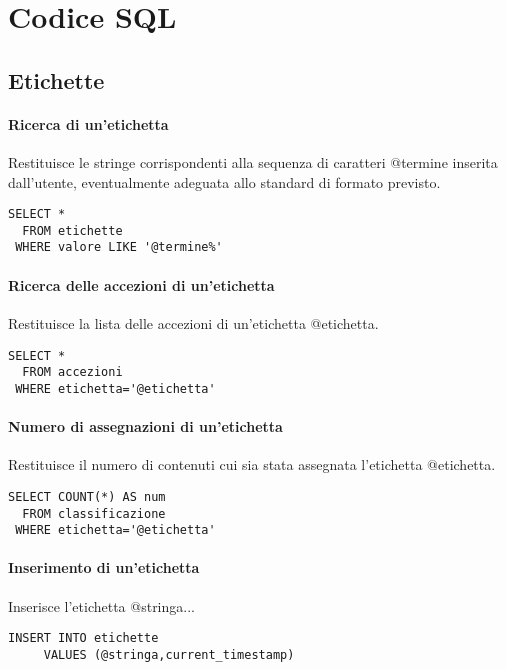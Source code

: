 \section*{Codice SQL}

\subsection*{Etichette}

\paragraph{Ricerca di un'etichetta}
Restituisce le stringe corrispondenti alla sequenza di caratteri \textsf{@termine} inserita dall'utente, eventualmente adeguata allo standard di formato previsto.

\begin{verbatim}
SELECT *
  FROM etichette	
 WHERE valore LIKE '@termine%'
\end{verbatim}
	
\paragraph{Ricerca delle accezioni di un'etichetta}
Restituisce la lista delle accezioni di un'etichetta \textsf{@etichetta}.
	
\begin{verbatim}
SELECT *
  FROM accezioni	
 WHERE etichetta='@etichetta'
\end{verbatim}

\paragraph{Numero di assegnazioni di un'etichetta}
Restituisce il numero di contenuti cui sia stata assegnata l'etichetta \textsf{@etichetta}.

\begin{verbatim}
SELECT COUNT(*) AS num
  FROM classificazione
 WHERE etichetta='@etichetta'
\end{verbatim}

\paragraph{Inserimento di un'etichetta}
Inserisce l'etichetta \textsf{@stringa}...
	
\begin{verbatim}
INSERT INTO etichette
     VALUES (@stringa,current_timestamp)
\end{verbatim}

